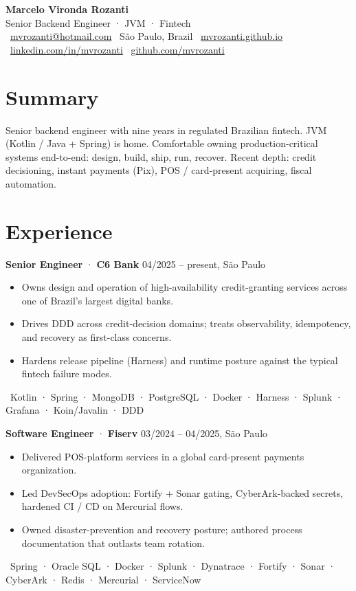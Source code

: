 \documentclass[10pt,a4paper]{article}
\newcommand{\role}[4]{%
  \noindent\textbf{\large #1} \textcolor{accent}{·} \textbf{#2} \hfill \textcolor{muted}{#3, #4}\par\vspace{2pt}}
\newcommand{\stack}[1]{\par\vspace{2pt}\textcolor{muted}{\small \faToolbox\ #1}\par}
\begin{document}
\pagestyle{empty}

\begin{center}
{\Huge\bfseries\color{heading} Marcelo Vironda Rozanti}\\[2pt]
{\large\color{accent} Senior Backend Engineer · JVM · Fintech}\\[4pt]
\small
\faEnvelope\ \href{mailto:mvrozanti@hotmail.com}{mvrozanti@hotmail.com} \quad
\faMapMarker*\ São Paulo, Brazil \quad
\faGlobe\ \href{https://mvrozanti.github.io}{mvrozanti.github.io} \quad
\faLinkedin\ \href{https://linkedin.com/in/mvrozanti}{linkedin.com/in/mvrozanti} \quad
\faGithub\ \href{https://github.com/mvrozanti}{github.com/mvrozanti}
\end{center}

\section{Summary}
Senior backend engineer with nine years in regulated Brazilian fintech. JVM (Kotlin / Java + Spring) is home. Comfortable owning production-critical systems end-to-end: design, build, ship, run, recover. Recent depth: credit decisioning, instant payments (Pix), POS / card-present acquiring, fiscal automation.

\section{Experience}

\role{Senior Engineer}{C6 Bank}{04/2025 -- present}{São Paulo}
\begin{itemize}
\item Owns design and operation of high-availability credit-granting services across one of Brazil's largest digital banks.
\item Drives DDD across credit-decision domains; treats observability, idempotency, and recovery as first-class concerns.
\item Hardens release pipeline (Harness) and runtime posture against the typical fintech failure modes.
\end{itemize}
\stack{Kotlin · Spring · MongoDB · PostgreSQL · Docker · Harness · Splunk · Grafana · Koin/Javalin · DDD}

\role{Software Engineer}{Fiserv}{03/2024 -- 04/2025}{São Paulo}
\begin{itemize}
\item Delivered POS-platform services in a global card-present payments organization.
\item Led DevSecOps adoption: Fortify + Sonar gating, CyberArk-backed secrets, hardened CI / CD on Mercurial flows.
\item Owned disaster-prevention and recovery posture; authored process documentation that outlasts team rotation.
\end{itemize}
\stack{Spring · Oracle SQL · Docker · Splunk · Dynatrace · Fortify · Sonar · CyberArk · Redis · Mercurial · ServiceNow}
\end{document}

